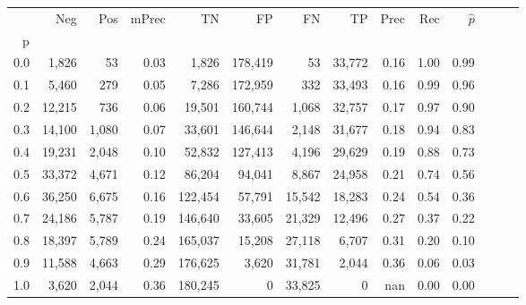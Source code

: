 \begin{tabular}{rrrrrrrrrrrrrr}
\toprule
{} &     Neg &    Pos & mPrec &       TN &       FP &      FN &      TP &  Prec &   Rec & $\hat{p}$ \\
p   &         &        &       &          &          &         &         &       &       &           \\
\midrule
0.0 &   1,826 &     53 &  0.03 &    1,826 &  178,419 &      53 &  33,772 &  0.16 &  1.00 &      0.99 \\
0.1 &   5,460 &    279 &  0.05 &    7,286 &  172,959 &     332 &  33,493 &  0.16 &  0.99 &      0.96 \\
0.2 &  12,215 &    736 &  0.06 &   19,501 &  160,744 &   1,068 &  32,757 &  0.17 &  0.97 &      0.90 \\
0.3 &  14,100 &  1,080 &  0.07 &   33,601 &  146,644 &   2,148 &  31,677 &  0.18 &  0.94 &      0.83 \\
0.4 &  19,231 &  2,048 &  0.10 &   52,832 &  127,413 &   4,196 &  29,629 &  0.19 &  0.88 &      0.73 \\
0.5 &  33,372 &  4,671 &  0.12 &   86,204 &   94,041 &   8,867 &  24,958 &  0.21 &  0.74 &      0.56 \\
0.6 &  36,250 &  6,675 &  0.16 &  122,454 &   57,791 &  15,542 &  18,283 &  0.24 &  0.54 &      0.36 \\
0.7 &  24,186 &  5,787 &  0.19 &  146,640 &   33,605 &  21,329 &  12,496 &  0.27 &  0.37 &      0.22 \\
0.8 &  18,397 &  5,789 &  0.24 &  165,037 &   15,208 &  27,118 &   6,707 &  0.31 &  0.20 &      0.10 \\
0.9 &  11,588 &  4,663 &  0.29 &  176,625 &    3,620 &  31,781 &   2,044 &  0.36 &  0.06 &      0.03 \\
1.0 &   3,620 &  2,044 &  0.36 &  180,245 &        0 &  33,825 &       0 &   nan &  0.00 &      0.00 \\
\bottomrule
\end{tabular}
